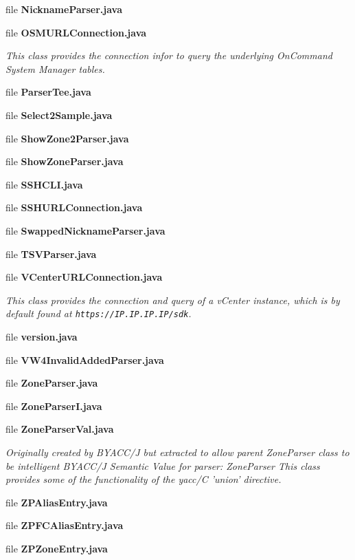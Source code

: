 \begin{DoxyCompactItemize}
file {\bf Nickname\+Parser.\+java}
\item 
file {\bf O\+S\+M\+U\+R\+L\+Connection.\+java}
\begin{DoxyCompactList}\small\item\em This class provides the connection infor to query the underlying On\+Command System Manager tables. \end{DoxyCompactList}\item 
file {\bf Parser\+Tee.\+java}
\item 
file {\bf Select2\+Sample.\+java}
\item 
file {\bf Show\+Zone2\+Parser.\+java}
\item 
file {\bf Show\+Zone\+Parser.\+java}
\item 
file {\bf S\+S\+H\+C\+L\+I.\+java}
\item 
file {\bf S\+S\+H\+U\+R\+L\+Connection.\+java}
\item 
file {\bf Swapped\+Nickname\+Parser.\+java}
\item 
file {\bf T\+S\+V\+Parser.\+java}
\item 
file {\bf V\+Center\+U\+R\+L\+Connection.\+java}
\begin{DoxyCompactList}\small\item\em This class provides the connection and query of a v\+Center instance, which is by default found at {\tt https\+://\+I\+P.\+I\+P.\+I\+P.\+I\+P/sdk}. \end{DoxyCompactList}\item 
file {\bf version.\+java}
\item 
file {\bf V\+W4\+Invalid\+Added\+Parser.\+java}
\item 
file {\bf Zone\+Parser.\+java}
\item 
file {\bf Zone\+Parser\+I.\+java}
\item 
file {\bf Zone\+Parser\+Val.\+java}
\begin{DoxyCompactList}\small\item\em Originally created by B\+Y\+A\+C\+C/\+J but extracted to allow parent Zone\+Parser class to be intelligent B\+Y\+A\+C\+C/\+J Semantic Value for parser\+: Zone\+Parser This class provides some of the functionality of the yacc/\+C 'union' directive. \end{DoxyCompactList}\item 
file {\bf Z\+P\+Alias\+Entry.\+java}
\item 
file {\bf Z\+P\+F\+C\+Alias\+Entry.\+java}
\item 
file {\bf Z\+P\+Zone\+Entry.\+java}
\end{DoxyCompactItemize}
